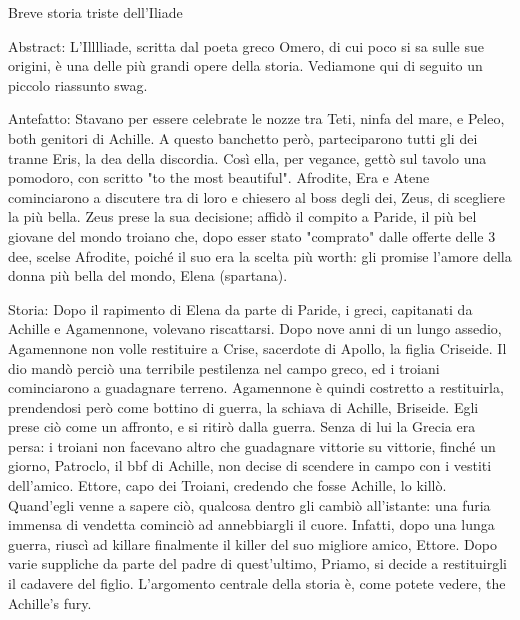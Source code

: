 \documentclass{article}
\begin{document}
Breve storia triste dell’Iliade

Abstract:
L'Illlliade, scritta dal poeta greco Omero, di cui poco si sa sulle sue
origini, è una delle più grandi opere della storia. Vediamone qui di seguito un
piccolo riassunto swag.

Antefatto:
Stavano per essere celebrate le nozze tra Teti, ninfa del mare, e Peleo, both
genitori di Achille. A questo banchetto però, parteciparono tutti gli dei
tranne Eris, la dea della discordia. Così ella, per vegance, gettò sul tavolo
una pomodoro, con scritto "to the most beautiful". Afrodite, Era e Atene
cominciarono a discutere tra di loro e chiesero al boss degli dei, Zeus, di
scegliere la più bella. Zeus prese la sua decisione; affidò il compito a
Paride, il più bel giovane del mondo troiano che, dopo esser stato "comprato" 
dalle offerte delle 3 dee, scelse Afrodite, poiché il suo era la scelta più
worth: gli promise l'amore della donna più bella del mondo, Elena (spartana).

Storia:
Dopo il rapimento di Elena da parte di Paride, i greci, capitanati da Achille e
Agamennone, volevano riscattarsi. Dopo nove anni di un lungo assedio,
Agamennone non volle restituire a Crise, sacerdote di Apollo, la figlia
Criseide. Il dio mandò perciò una terribile pestilenza nel campo greco, ed i
troiani cominciarono a guadagnare terreno. Agamennone è quindi costretto a
restituirla, prendendosi però come bottino di guerra, la schiava di Achille,
Briseide. Egli prese ciò come un affronto, e si ritirò dalla guerra. 
Senza di lui la Grecia era persa: i troiani non facevano altro che guadagnare
vittorie su vittorie, finché un giorno, Patroclo, il bbf di Achille, non decise
di scendere in campo con i vestiti dell'amico. Ettore, capo dei Troiani,
credendo che fosse Achille, lo killò. Quand'egli venne a sapere ciò, qualcosa
dentro gli cambiò all'istante: una furia immensa di vendetta cominciò ad
annebbiargli il cuore. Infatti, dopo una lunga guerra, riuscì ad killare
finalmente il killer del suo migliore amico, Ettore. Dopo varie suppliche da
parte del padre di quest'ultimo, Priamo, si decide a restituirgli il cadavere
del figlio. L'argomento centrale della storia è, come potete vedere, the
Achille's fury.
\end{document}
